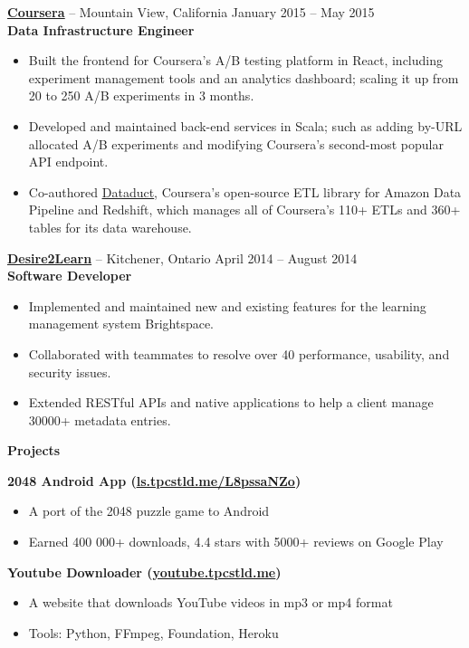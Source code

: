 \documentclass{letter}
\begin{document}
\vspace{-1.5mm}
{\bfseries \href{https://www.coursera.org}{\uline{Coursera}}} -- Mountain View, California \hfill January 2015 -- May 2015 \\
{\bfseries Data Infrastructure Engineer}
\vspace{-3mm}
\begin{itemize}
    \item Built the frontend for Coursera's A/B testing platform in React, including
      experiment management tools and an analytics dashboard; scaling it up from 20 to
      250 A/B experiments in 3 months.
    \item Developed and maintained back-end services in Scala; such as adding
      by-URL allocated A/B experiments and modifying Coursera's second-most
      popular API endpoint.
    \item Co-authored \href{https://github.com/coursera/dataduct}{\uline{Dataduct}},
      Coursera's open-source ETL library for Amazon Data Pipeline and
      Redshift, which manages all of Coursera's 110+ ETLs and 360+ tables for its data warehouse.
\end{itemize}

\vspace{-1.5mm}
{\bfseries \href{http://www.d2l.com}{\uline{Desire2Learn}}} -- Kitchener, Ontario \hfill April 2014 -- August 2014 \\
{\bfseries Software Developer}
\vspace{-3mm}
\begin{itemize}
    \item Implemented and maintained new and existing features for the learning
      management system Brightspace.
    \item Collaborated with teammates to resolve over 40 performance, usability, and security issues.
    \item Extended RESTful APIs and native applications to help a client manage 30000+ metadata entries.
\end{itemize}

{\bfseries \Large Projects}

\vspace{-1.5mm}
{\bfseries 2048 Android App (\href{http://ls.tpcstld.me/L8pssaNZo}{\uline{ls.tpcstld.me/L8pssaNZo}})}
\vspace{-3mm}
\begin{itemize}
    \item A port of the 2048 puzzle game to Android
    \item Earned 400 000+ downloads, 4.4 stars with 5000+ reviews on Google Play
\end{itemize}
\vspace{-3mm}
{\bfseries Youtube Downloader (\href{http://youtube.tpcstld.me}{\uline{youtube.tpcstld.me}})}
\vspace{-3mm}
\begin{itemize}
    \item A website that downloads YouTube videos in mp3 or mp4 format
    \item Tools: Python, FFmpeg, Foundation, Heroku
\end{itemize}
\end{document}

